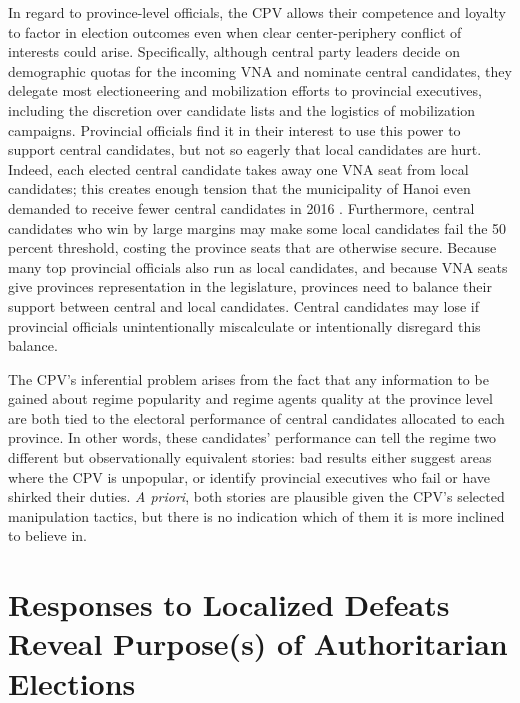 \documentclass[12pt]{article}
\newcommand{\1}{\mathbbm{1}}
\begin{document}
In regard to province-level officials, the CPV allows their competence and loyalty to factor in election outcomes even when clear center-periphery conflict of interests could arise. Specifically, although central party leaders decide on demographic quotas for the incoming VNA and nominate central candidates, they delegate most electioneering and mobilization efforts to provincial executives, including the discretion over candidate lists and the logistics of mobilization campaigns. Provincial officials find it in their interest to use this power to support central candidates, but not so eagerly that local candidates are hurt. Indeed, each elected central candidate takes away one VNA seat from local candidates; this creates enough tension that the municipality of Hanoi even demanded to receive fewer central candidates in 2016 \citep{vnexpress2016_2}. Furthermore, central candidates who win by large margins may make some local candidates fail the 50 percent threshold, costing the province seats that are otherwise secure. Because many top provincial officials also run as local candidates, and because VNA seats give provinces representation in the legislature, provinces need to balance their support between central and local candidates. Central candidates may lose if provincial officials unintentionally miscalculate or intentionally disregard this balance.

The CPV's inferential problem arises from the fact that any information to be gained about regime popularity and regime agents quality at the province level are both tied to the electoral performance of central candidates allocated to each province. In other words, these candidates' performance can tell the regime two different but observationally equivalent stories: bad results either suggest areas where the CPV is unpopular, or identify provincial executives who fail or have shirked their duties. \textit{A priori}, both stories are plausible given the CPV's selected manipulation tactics, but there is no indication which of them it is more inclined to believe in.

\section{Responses to Localized Defeats Reveal Purpose(s) of Authoritarian Elections}
\label{sec:theory_local_defeat}
\end{document}
